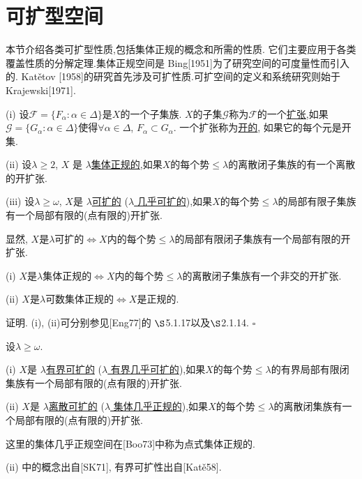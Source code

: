 \section{可扩型空间}\label{ch1.3}
本节介绍各类可扩型性质,包括集体正规的概念和所需的性质.
它们主要应用于各类覆盖性质的分解定理.集体正规空间是 Bing[1951]为了研究空间的可度量性而引入的. Kat\v{e}tov [1958]的研究首先涉及可扩性质.可扩空间的定义和系统研究则始于
Krajewski[1971].

\begin{definition}
	\textnormal{(i)} 设$\mathscr{F}=\{F_\alpha:\alpha\in\Delta\}$是$X$的一个子集族.
	$X$的子集$\mathscr{G}$称为$\mathscr{F}$的一个\underline{扩张},如果
	$\mathscr{G}=\{G_\alpha:\alpha\in\Delta\}$使得$\forall\alpha\in\Delta$, $F_\alpha\subset G_\alpha$. 一个扩张称为\underline{开的}, 如果它的每个元是开集.
	
	\textnormal{(ii)} 设$\lambda\ge 2$, $X$ 是 \underline{$\lambda$集体正规的},如果$X$的每个势$\le\lambda$的离散闭子集族的有一个离散的开扩张.
	
	\textnormal{(iii)} 设$\lambda\ge \omega$, $X$是 \underline{$\lambda$可扩的}
	\textnormal{(}\underline{$\lambda$ 几乎可扩的}\textnormal{)},如果$X$的每个势$\le\lambda$的局部有限子集族有一个局部有限的\textnormal{(}点有限的\textnormal{)}开扩张.
\end{definition}

\begin{note}
	显然, $X$是$\lambda$可扩的$\Leftrightarrow X$内的每个势$\le\lambda$的局部有限闭子集族有一个局部有限的开扩张.
\end{note}

\begin{fact}
	\textnormal{(i)} 	$X$是$\lambda$集体正规的$\Leftrightarrow X$内的每个势$\le\lambda$的离散闭子集族有一个非交的开扩张.
	
	\textnormal{(ii)} $X$是$\lambda$可数集体正规的$\Leftrightarrow X$是正规的.
\end{fact}

证明. (i), (ii)可分别参见[Eng77]的 $\S$5.1.17以及$\S$2.1.14. $\square$

\begin{definition}
	设$\lambda\ge \omega$.

	\textnormal{(i)} $X$是 \underline{$\lambda$有界可扩的}
\textnormal{(}\underline{$\lambda$ 有界几乎可扩的}\textnormal{)},如果$X$的每个势$\le\lambda$的有界局部有限闭集族有一个局部有限的\textnormal{(}点有限的\textnormal{)}开扩张.

	\textnormal{(ii)} $X$是 \underline{$\lambda$离散可扩的}
\textnormal{(}\underline{$\lambda$ 集体几乎正规的}\textnormal{)},如果$X$的每个势$\le\lambda$的离散闭集族有一个局部有限的\textnormal{(}点有限的\textnormal{)}开扩张.
\end{definition}

这里的集体几乎正规空间在[Boo73]中称为点式集体正规的.

(ii) 中的概念出自[SK71], 有界可扩性出自[Kat\v{e}58].